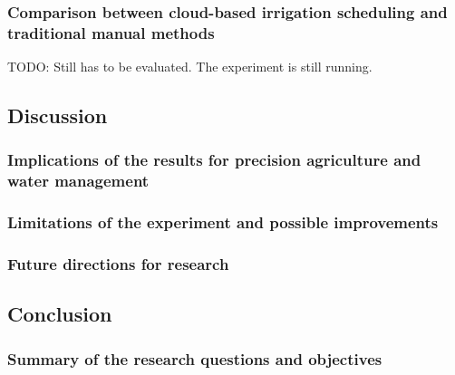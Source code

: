 \documentclass[11pt]{scrartcl} %
\begin{document}
\subsubsection{Comparison between cloud-based irrigation scheduling and traditional manual methods}
TODO: Still has to be evaluated. The experiment is still running.
\subsection{Discussion}
\subsubsection{Implications of the results for precision agriculture and water management}
\subsubsection{Limitations of the experiment and possible improvements}
\subsubsection{Future directions for research}
\subsection{Conclusion}
\subsubsection{Summary of the research questions and objectives}
\end{document}
